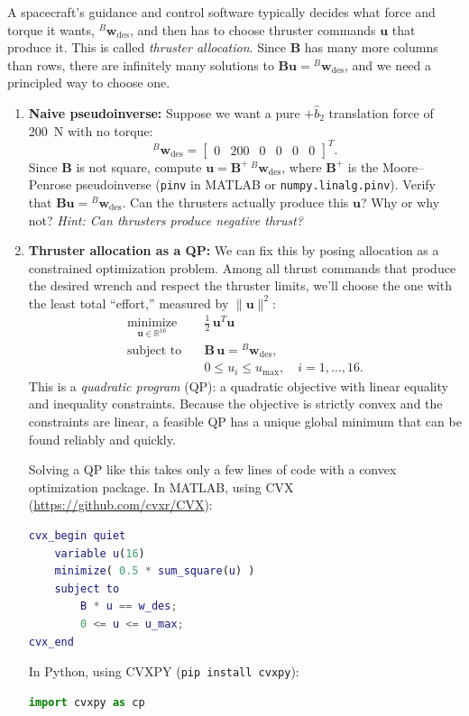 \documentclass[11pt,letterpaper]{article}
\newcommand{\bu}{\mathbf{u}}
\newcommand{\bB}{\mathbf{B}}
\newcommand{\bwr}{\mathbf{w}}
\begin{document}
A spacecraft's guidance and control software typically decides what force and torque it wants, ${}^{B}\bwr_{\text{des}}$, and then has to choose thruster commands $\bu$ that produce it. This is called \emph{thruster allocation}. Since $\bB$ has many more columns than rows, there are infinitely many solutions to $\bB\bu = {}^{B}\bwr_{\text{des}}$, and we need a principled way to choose one.

\begin{enumerate}[label=(\alph*)]
    \item \textbf{Naive pseudoinverse:} Suppose we want a pure $+\hat b_2$ translation force of 200~N with no torque:
    \[
    {}^{B}\bwr_{\text{des}} = \begin{bmatrix} 0 & 200 & 0 & 0 & 0 & 0 \end{bmatrix}^T.
    \]
    Since $\bB$ is not square, compute $\bu = \bB^{+}\,{}^{B}\bwr_{\text{des}}$, where $\bB^{+}$ is the Moore--Penrose pseudoinverse (\texttt{pinv} in MATLAB or \texttt{numpy.linalg.pinv}). Verify that $\bB\bu = {}^{B}\bwr_{\text{des}}$. Can the thrusters actually produce this $\bu$? Why or why not? \emph{Hint: Can thrusters produce negative thrust?}

    \item \textbf{Thruster allocation as a QP:} We can fix this by posing allocation as a constrained optimization problem. Among all thrust commands that produce the desired wrench and respect the thruster limits, we'll choose the one with the least total ``effort,'' measured by $\lVert\bu\rVert^2$:
    \begin{equation*}
    \begin{aligned}
    \underset{\bu \in \mathbb{R}^{16}}{\text{minimize}} \quad & \tfrac12\,\bu^T\bu \\
    \text{subject to} \quad & \bB\,\bu = {}^{B}\bwr_{\text{des}}, \\
    & 0 \le u_i \le u_{\max}, \quad i = 1,\dots,16.
    \end{aligned}
    \end{equation*}
    This is a \emph{quadratic program} (QP): a quadratic objective with linear equality and inequality constraints. Because the objective is strictly convex and the constraints are linear, a feasible QP has a unique global minimum that can be found reliably and quickly.
    
    Solving a QP like this takes only a few lines of code with a convex optimization package. In MATLAB, using CVX (\url{https://github.com/cvxr/CVX}):
\begin{lstlisting}[language=Matlab]
cvx_begin quiet
    variable u(16)
    minimize( 0.5 * sum_square(u) )
    subject to
        B * u == w_des;
        0 <= u <= u_max;
cvx_end
\end{lstlisting}
    In Python, using CVXPY (\texttt{pip install cvxpy}):
\begin{lstlisting}[language=Python]
import cvxpy as cp


\end{lstlisting}
\end{enumerate}
\end{document}
